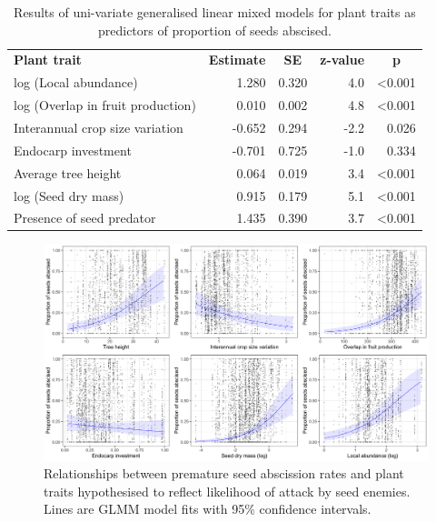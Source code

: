 \begin{table}[!h]
    \centering
    \caption{Results of uni-variate generalised linear mixed models for plant traits as predictors of proportion of seeds abscised.}
        \begin{tabular}{lrrrr}
        \textbf{Plant trait} & \multicolumn{1}{c}{\textbf{Estimate}} & \multicolumn{1}{c}{\textbf{SE}} & \multicolumn{1}{c}{\textbf{z-value}} & \multicolumn{1}{c}{\textbf{p}} \\
        log (Local abundance) & 1.280 & 0.320 & 4.0 & \textless 0.001 \\
        log (Overlap in fruit production) & 0.010 & 0.002 & 4.8 & \textless 0.001 \\
        Interannual crop size variation & -0.652 & 0.294 & -2.2 & 0.026 \\
        Endocarp investment & -0.701 & 0.725 & -1.0 & 0.334 \\
        Average tree height & 0.064 & 0.019 & 3.4 & \textless 0.001 \\
        log (Seed dry mass) & 0.915 & 0.179 & 5.1 & \textless 0.001 \\
        Presence of seed predator & 1.435 & 0.390 & 3.7 & \textless 0.001
        \end{tabular}
\label{tab:glmms}
\end{table}

\begin{figure}[!h]
\centering
\includegraphics[width=15cm]{glmms.png}
\caption{Relationships between premature seed abscission rates and plant traits hypothesised to reflect likelihood of attack by seed enemies. Lines are GLMM model fits with 95\% confidence intervals.}
\label{fig:glmms}
\end{figure}

